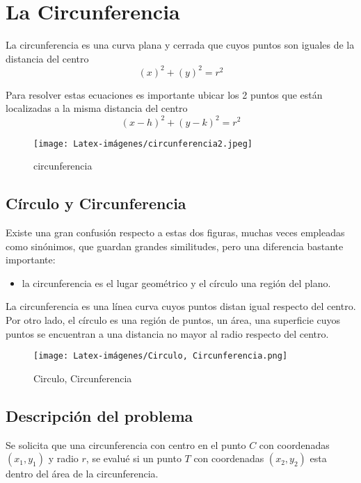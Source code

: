 \section{La Circunferencia}
La circunferencia es una curva plana y cerrada que cuyos puntos son iguales de la distancia del centro
\begin{equation}
    (x)^{2} + (y )^{2} =r^{2}
\end{equation}

Para resolver estas ecuaciones es importante ubicar los 2 puntos que están localizadas a la misma distancia del centro
\begin{equation}
    (x - h)^{2} + (y - k)^{2} =r^{2}
\end{equation}

\begin {figure}[h!]
\centerline{\texttt{[image: Latex-imágenes/circunferencia2.jpeg]}}
\caption{circunferencia}
\label{fig}
\end {figure}

\subsection{Círculo y Circunferencia}

Existe una gran confusión respecto a estas dos figuras, muchas veces empleadas como sinónimos, que guardan grandes similitudes, pero una diferencia bastante importante:
\begin{itemize}
\item la circunferencia es el lugar geométrico y el círculo una región del plano.
\end{itemize}

La circunferencia es una línea curva cuyos puntos distan igual respecto del centro. Por otro lado, el círculo es una región de puntos, un área, una superficie cuyos puntos se encuentran a una distancia no mayor al radio respecto del centro.

\begin {figure}[h!]
\centerline{\texttt{[image: Latex-imágenes/Circulo, Circunferencia.png]}}
\caption{Circulo, Circunferencia}
\label{fig}
\end {figure}

\subsection{Descripción del problema}

Se solicita que una circunferencia con centro en el punto $C$ con coordenadas $(x_{1}, y_{1})$ y radio $r$, se evalué si un punto $T$ con coordenadas $(x_{2}, y_{2})$ esta dentro del área de la circunferencia.

